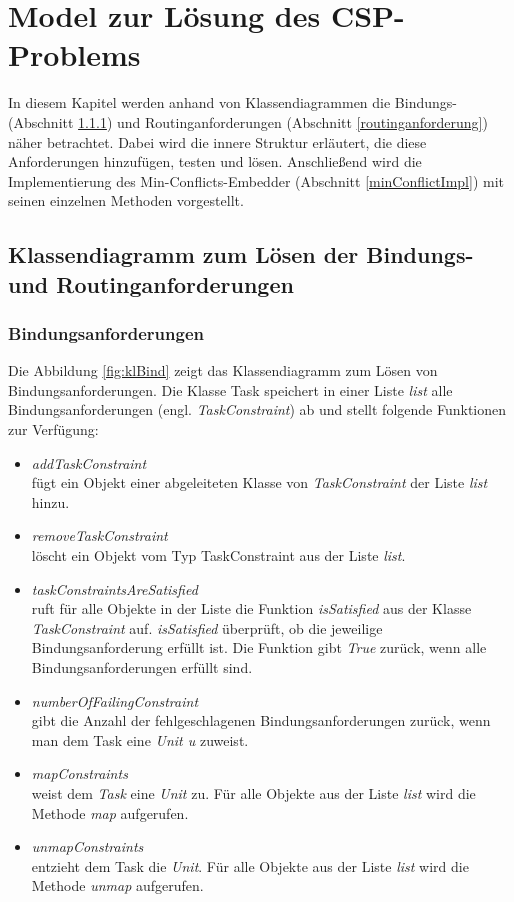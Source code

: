 \chapter{Model zur Lösung des CSP-Problems}\label{model}

In diesem Kapitel werden anhand von Klassendiagrammen die Bindungs- (Abschnitt \ref{bindunganforderung}) und Routinganforderungen (Abschnitt \ref{routinganforderung}) näher betrachtet. Dabei wird die innere Struktur erläutert, die diese Anforderungen hinzufügen, testen und lösen. Anschließend wird die Implementierung des Min-Conflicts-Embedder (Abschnitt \ref{minConflictImpl}) mit seinen einzelnen Methoden vorgestellt.

\section{Klassendiagramm zum Lösen der Bindungs- und Routinganforderungen}

\subsection{Bindungsanforderungen}\label{bindunganforderung}

Die Abbildung \ref{fig:klBind} zeigt das Klassendiagramm zum Lösen von Bindungsanforderungen. Die Klasse Task speichert in einer Liste \textit{list} alle Bindungsanforderungen (engl. \textit{TaskConstraint}) ab und stellt folgende Funktionen zur Verfügung:

\begin{itemize}
\item \textit{addTaskConstraint}\\
fügt ein Objekt einer abgeleiteten Klasse von \textit{TaskConstraint} der Liste \textit{list} hinzu. 
\item \textit{removeTaskConstraint}\\
löscht ein Objekt vom Typ TaskConstraint aus der Liste \textit{list}.
\item \textit{taskConstraintsAreSatisfied}\\
ruft für alle Objekte in der Liste die Funktion \textit{isSatisfied} aus der Klasse \textit{TaskConstraint} auf. \textit{isSatisfied} überprüft, ob die jeweilige Bindungsanforderung erfüllt ist. Die Funktion gibt \textit{True} zurück, wenn alle Bindungsanforderungen erfüllt sind.%
\item \textit{numberOfFailingConstraint}\\
gibt die Anzahl der fehlgeschlagenen Bindungsanforderungen zurück, wenn man dem Task eine \textit{Unit u} zuweist. 
\item \textit{mapConstraints}\\
weist dem \textit{Task} eine \textit{Unit} zu. Für alle Objekte aus der Liste \textit{list} wird die Methode \textit{map} aufgerufen.
\item \textit{unmapConstraints}\\
entzieht dem Task die \textit{Unit}. Für alle Objekte aus der Liste \textit{list} wird die Methode \textit{unmap} aufgerufen.
\end{itemize}

